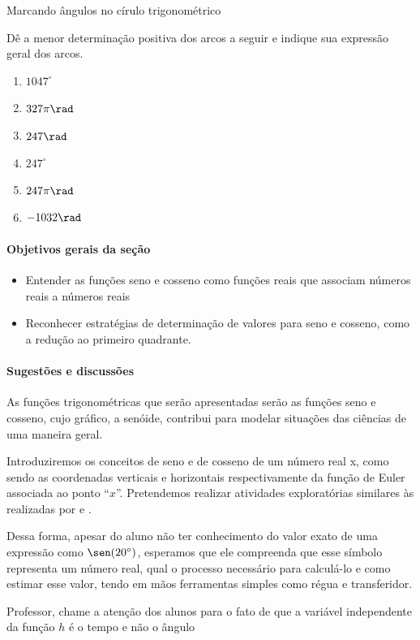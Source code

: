 \begin{task}{Marcando ângulos no círulo trigonométrico}
\label{trig-ativ14}

Dê a menor determinação positiva dos arcos a seguir e indique sua expressão geral dos arcos.
\begin{enumerate}
\item $1047^{\circ}$
\item $327\pi\rad$
\item $247\rad$
\item $247^{\circ}$
\item $247\pi\rad$
\item $-1032\rad$
\end{enumerate}
\end{task}

\cleardoublepage
\def\currentcolor{session1}
\begin{texto}
{
	\paragraph{Objetivos gerais da seção}

	\begin{itemize}
	\item  Entender as funções seno e cosseno como funções reais que 	associam números reais a números reais
	\item Reconhecer estratégias de determinação de valores para 	seno e cosseno, como a redução ao primeiro quadrante.
	\end{itemize}

	\paragraph{Sugestões e discussões}

	As funções trigonométricas que serão apresentadas serão as funções seno e cosseno, cujo gráfico, a senóide, contribui para modelar situações das ciências de uma maneira geral. 

	Introduziremos os conceitos de seno e de cosseno de um número real x, como sendo as coordenadas verticais e horizontais respectivamente da função de Euler associada ao ponto “$x$”. Pretendemos realizar atividades exploratórias similares às realizadas por \cite{weber2005} e \cite{costa2017}.

	Dessa forma, apesar do aluno não ter conhecimento do valor exato de uma expressão como $\sen(20^{\circ})$, esperamos que ele compreenda que esse símbolo representa um número real, qual o processo necessário para calculá-lo e como estimar esse valor, tendo em mãos ferramentas simples como régua e transferidor. 

	Professor, chame a atenção dos alunos para o fato de que a variável independente da função $h$ é o tempo e não o ângulo
}	
\end{texto}
